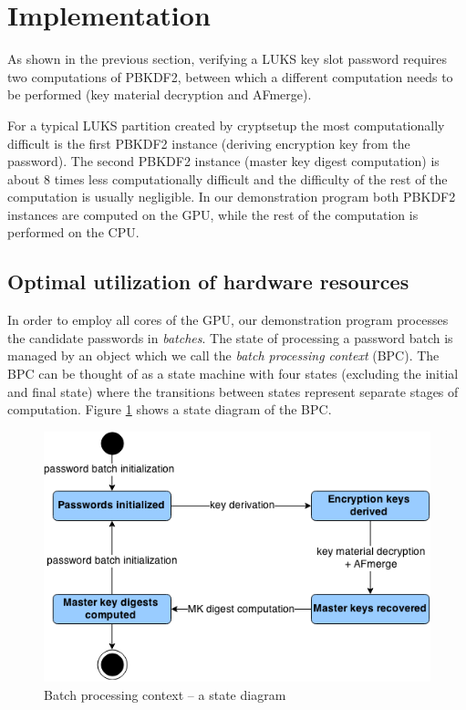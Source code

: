 \documentclass[12pt,oneside]{fithesis2}
\begin{document}
      \section{Implementation} \label{s:demoProgImpl}
      As shown in the previous section, verifying a LUKS key slot password requires two computations of PBKDF2, between which a different computation needs to be performed (key material decryption and AFmerge).
      
      For a typical LUKS partition created by cryptsetup the most computationally difficult is the first PBKDF2 instance (deriving encryption key from the password). The second PBKDF2 instance (master key digest computation) is about 8 times less computationally difficult and the difficulty of the rest of the computation is usually negligible. In our demonstration program both PBKDF2 instances are computed on the GPU, while the rest of the computation is performed on the CPU.
      
      \subsection{Optimal utilization of hardware resources}
      In order to employ all cores of the GPU, our demonstration program processes the candidate passwords in \emph{batches}. The state of processing a password batch is managed by an object which we call the \emph{batch processing context} (BPC). The BPC can be thought of as a state machine with four states (excluding the initial and final state) where the transitions between states represent separate stages of computation. Figure \ref{fig:processingContext} shows a state diagram of the BPC.
      
      \begin{figure}[t]
        \centering
        \includegraphics[width=\linewidth]{images/bpc.png}
        \caption{Batch processing context -- a state diagram}
        \label{fig:processingContext}
      \end{figure}
      
\end{document}
